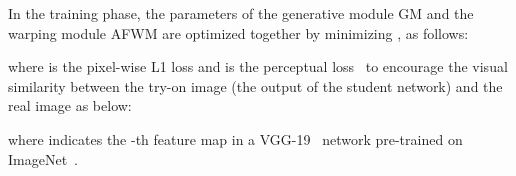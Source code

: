 \documentclass[final]{cvpr}
\begin{document}
In the training phase, the parameters of the generative module GM and the warping module AFWM are optimized together by minimizing , as follows:
	\begin{small}
		
	\end{small}
where  is the pixel-wise L1 loss and  is the perceptual loss~\cite{perceptual} to encourage the visual similarity between the try-on image (\ie the output  of the student network) and the real image  as below:
\begin{small}
		
	\end{small}
	\begin{small}
		
	\end{small}
	where  indicates the -th feature map in a VGG-19~\cite{vgg} network pre-trained on ImageNet~\cite{imagenet}. 
	
	
	
\end{document}
